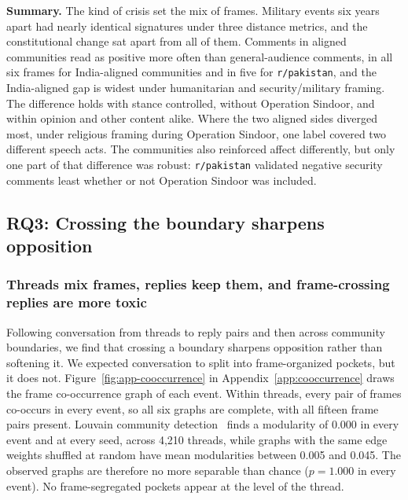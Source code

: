 \textbf{Summary.} The kind of crisis set the mix of frames. Military events six years apart had nearly identical signatures under three distance metrics, and the constitutional change sat apart from all of them. Comments in aligned communities read as positive more often than general-audience comments, in all six frames for India-aligned communities and in five for \texttt{r/pakistan}, and the India-aligned gap is widest under humanitarian and security/military framing. The difference holds with stance controlled, without Operation Sindoor, and within opinion and other content alike. Where the two aligned sides diverged most, under religious framing during Operation Sindoor, one label covered two different speech acts. The communities also reinforced affect differently, but only one part of that difference was robust: \texttt{r/pakistan} validated negative security comments least whether or not Operation Sindoor was included.

\subsection{RQ3: Crossing the boundary sharpens opposition}
\label{sec:results-rq3}

\subsubsection{Threads mix frames, replies keep them, and frame-crossing replies are more toxic}
\label{sec:results-threads}

Following conversation from threads to reply pairs and then across community boundaries, we find that crossing a boundary sharpens opposition rather than softening it. We expected conversation to split into frame-organized pockets, but it does not. Figure~\ref{fig:app-cooccurrence} in Appendix~\ref{app:cooccurrence} draws the frame co-occurrence graph of each event. Within threads, every pair of frames co-occurs in every event, so all six graphs are complete, with all fifteen frame pairs present. Louvain community detection~\cite{blondel2008fast} finds a modularity of 0.000 in every event and at every seed, across 4,210 threads, while graphs with the same edge weights shuffled at random have mean modularities between 0.005 and 0.045. The observed graphs are therefore no more separable than chance ($p = 1.000$ in every event). No frame-segregated pockets appear at the level of the thread.

